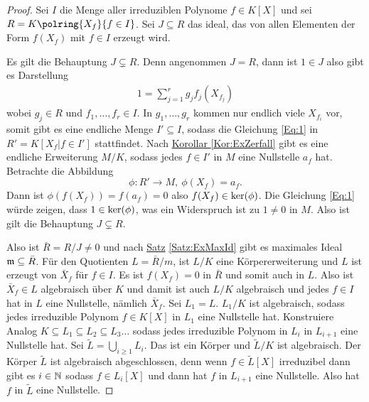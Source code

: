 \begin{proof}
    Sei $I$ die Menge aller irreduziblen Polynome $f\in K[X]$ und sei $R=K\polring{X_f}{f\in I}$. Sei $J\subseteq R$ das ideal, das von allen Elementen der Form $f(X_f)$ mit $f\in I$ erzeugt wird.
    
    Es gilt die Behauptung $J\subsetneq R$. Denn angenommen $J=R$, dann ist $1\in J$ also gibt es Darstellung 
    \begin{align} 1=\sum_{j=1}^rg_jf_j(X_{f_j})\label{Eq:1}
    \end{align} wobei $g_j\in R$ und $f_1,\dots,f_r\in I$. In $g_1,\dots,g_r$ kommen nur endlich viele $X_{f_i}$ vor, somit gibt es eine endliche Menge $I'\subseteq I$, sodass die Gleichung \ref{Eq:1} in $R'=K[X_f| f\in I']$ stattfindet.
    Nach \hyperref[Kor:ExZerfall]{Korollar }\ref{Kor:ExZerfall} gibt es eine endliche Erweiterung $M/K$, sodass jedes $f\in I'$ in $M$ eine Nullstelle $a_f$ hat. Betrachte die Abbildung $$\phi\colon R'\to M,\ \phi(X_f)=a_f.$$
    Dann ist $\phi(f(X_f))=f(a_f)=0$ also $f(X_f)\in \operatorname{ker}(\phi)$. Die Gleichung \ref{Eq:1} würde zeigen, dass $1\in \operatorname{ker}(\phi)$, was ein Widerspruch ist zu $1\neq 0$ in $M$.
    Also ist gilt die Behauptung $J\subsetneq R$.
    
    Also ist $\bar R=R/J\neq 0$ und nach \hyperref[Satz:ExMaxId]{Satz} \ref{Satz:ExMaxId} gibt es maximales Ideal $\mathfrak{m}\subseteq \bar R$. Für den Quotienten $L=\bar R/m$, ist $L/K$ eine Körpererweiterung und $L$ ist erzeugt von $\bar X_f$ für $f\in I$. Es ist $f(X_f)=0$ in $\bar R$ und somit auch in $L$. Also ist $\bar X_f\in L$ algebraisch über $K$ und damit ist auch $L/K$ algebraisch und jedes $f\in I$ hat in $L$ eine Nullstelle, nämlich $\bar X_f$.
    Sei $L_1=L$. $L_1/K$ ist algebraisch, sodass jedes irreduzible Polynom $f\in K[X]$ in $L_1$ eine Nullstelle hat.
    Konstruiere Analog $K\subseteq L_1\subseteq L_2\subseteq L_3\dots$ sodass jedes irreduzible Polynom in $L_i$ in $L_{i+1}$ eine Nullstelle hat. Sei $\tilde L= \bigcup\limits_{i\geq 1}L_i$. Das ist  ein Körper und $\tilde L/K$ ist algebraisch.
    Der Körper $\tilde L$ ist algebraisch abgeschlossen, denn wenn $f\in \tilde L[X]$ irreduzibel dann gibt es $i\in\mathbb{N}$ sodass $f\in L_i[X]$ und dann hat $f$ in $L_{i+1}$ eine Nullstelle. Also hat $f$ in $\tilde L$ eine Nullstelle.
\end{proof}
